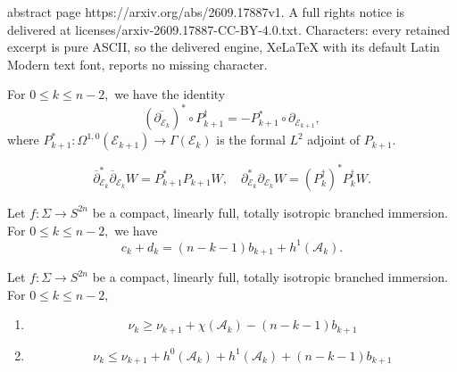 \documentclass[10pt,a4paper]{amsart}
\newcommand{\delbar}{\overline{\partial}}
\newcommand{\del}{\partial}
\begin{document}
abstract page https://arxiv.org/abs/2609.17887v1. A full rights notice is delivered at licenses/arxiv-2609.17887-CC-BY-4.0.txt. Characters: every retained excerpt is pure ASCII, so the delivered engine, XeLaTeX with its default Latin Modern text font, reports no missing character.
\begin{prop}\label{prop:commutident}
	For $0 \leq k \leq n-2,$ we have the identity
	\begin{equation*}
		(\overline{\partial_{\mathcal{E}_k}})^* \circ P_{k+1}^\dagger = -P_{k+1}^* \circ \partial_{\mathcal{E}_{k+1}},
	\end{equation*}
	where $P_{k+1}^*: \Omega^{1,0}(\mathcal{E}_{k+1}) \to \Gamma(\mathcal{E}_{k})$ is the formal $L^2$ adjoint of $P_{k+1}.$
\end{prop}

\begin{equation}\label{eq:qkJacobiidentities}
    \delbar^*_{\mathcal{E}_k} \delbar_{\mathcal{E}_k} W = P_{k+1}^* P_{k+1} W, \quad \del^*_{\mathcal{E}_k} \del_{\mathcal{E}_k} W = (P_k^\dagger)^* P^\dagger_k W.
\end{equation}

\begin{lemma}\label{lem:ckdkcalc}
    Let $f: \Sigma \to S^{2n}$ be a compact, linearly full, totally isotropic branched immersion. For $0 \leq k \leq n-2,$ we have
    \begin{equation*}
        c_k + d_k = (n-k-1)b_{k+1} + h^1(\mathcal{A}_k).
    \end{equation*}
\end{lemma}

\begin{prop}\label{prop:nullityinduction}
    Let $f: \Sigma \to S^{2n}$ be a compact, linearly full, totally isotropic branched immersion. For $0 \leq k \leq n-2,$
    \begin{enumerate}[label=(\alph*)]
        \item \begin{equation}
            \nu_k \geq \nu_{k+1} + \chi(\mathcal{A}_k) - (n-k-1)b_{k+1}
        \end{equation}
        \item
            \begin{equation}
                \nu_k \leq \nu_{k+1} + h^0(\mathcal{A}_k) + h^1(\mathcal{A}_k) + (n-k-1)b_{k+1}
            \end{equation}
    \end{enumerate}
\end{prop}
\end{document}
